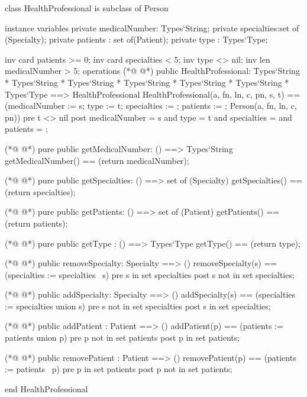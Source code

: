 \begin{vdmpp}[breaklines=true]
class HealthProfessional is subclass of Person

instance variables
  private medicalNumber: Types`String;
  private specialties:set of (Specialty);
  private patients : set of(Patient);
 private type : Types`Type;
 
 inv card patients >= 0;
  inv card specialties < 5;
 inv type <> nil;
 inv len medicalNumber > 5;
operations
(*@
\label{HealthProfessional:14}
@*)
 public HealthProfessional: Types`String * Types`String * Types`String * Types`String * Types`String * Types`String * Types`Type ==> HealthProfessional
  HealthProfessional(a, fn, ln, c, pn, s, t) == (medicalNumber := s; type := t; specialties := {}; patients := {}; Person(a, fn, ln, c, pn))
 pre t <> nil
 post medicalNumber = s and type = t and specialties = {} and patients = {};
 
(*@
\label{getMedicalNumber:19}
@*)
 pure public getMedicalNumber: () ==> Types`String
  getMedicalNumber() == (return medicalNumber);
 
(*@
\label{getSpecialties:22}
@*)
 pure public getSpecialties: () ==> set of (Specialty)
  getSpecialties() == (return specialties);
 
(*@
\label{getPatients:25}
@*)
 pure public getPatients: () ==> set of (Patient)
  getPatients() == (return patients);
  
(*@
\label{getType:28}
@*)
 pure public getType : () ==> Types`Type
  getType() == (return type);
  
(*@
\label{removeSpecialty:31}
@*)
 public removeSpecialty: Specialty ==> ()
  removeSpecialty(s) == (specialties := specialties \ {s})
 pre s in set specialties
 post s not in set specialties;
  
(*@
\label{addSpecialty:36}
@*)
 public addSpecialty: Specialty ==> ()
  addSpecialty(s) == (specialties := specialties union {s})
 pre s not in set specialties
 post s in set specialties;
 
(*@
\label{addPatient:41}
@*)
 public addPatient : Patient ==> ()
  addPatient(p) == (patients :=  patients union {p})
 pre p not in set patients
 post p in set patients;
 
(*@
\label{removePatient:46}
@*)
 public removePatient : Patient ==> ()
  removePatient(p) == (patients := patients \ {p})
 pre p in set patients
 post p not in set patients;

end HealthProfessional
\end{vdmpp}
\bigskip
